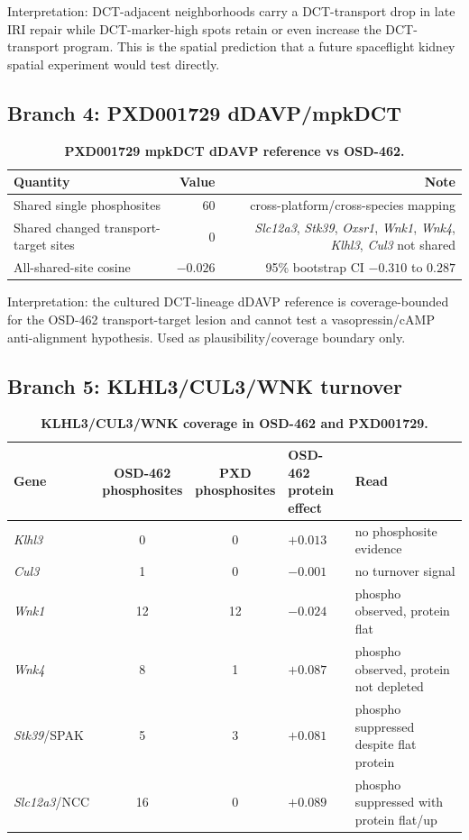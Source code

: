 \documentclass[10pt]{article}
\newcommand{\gene}[1]{\textit{#1}}
\begin{document}
\noindent
Interpretation: DCT-adjacent neighborhoods carry a DCT-transport drop in late IRI repair while DCT-marker-high spots retain or even increase the DCT-transport program. This is the spatial prediction that a future spaceflight kidney spatial experiment would test directly.

\subsection{Branch 4: PXD001729 dDAVP/mpkDCT}

\begin{table}[H]
\centering\small
\caption{\textbf{PXD001729 mpkDCT dDAVP reference vs OSD-462.}}
\label{tab:pxdshared}
\begin{tabular}{lrr}
\toprule
Quantity & Value & Note \\
\midrule
Shared single phosphosites & 60 & cross-platform/cross-species mapping \\
Shared changed transport-target sites & 0 & \gene{Slc12a3}, \gene{Stk39}, \gene{Oxsr1}, \gene{Wnk1}, \gene{Wnk4}, \gene{Klhl3}, \gene{Cul3} not shared \\
All-shared-site cosine & $-0.026$ & 95\% bootstrap CI $-0.310$ to $0.287$ \\
\bottomrule
\end{tabular}
\end{table}

\noindent
Interpretation: the cultured DCT-lineage dDAVP reference is coverage-bounded for the OSD-462 transport-target lesion and cannot test a vasopressin/cAMP anti-alignment hypothesis. Used as plausibility/coverage boundary only.

\subsection{Branch 5: KLHL3/CUL3/WNK turnover}

\begin{table}[H]
\centering\small
\caption{\textbf{KLHL3/CUL3/WNK coverage in OSD-462 and PXD001729.}}
\label{tab:klhlcoverage}
\begin{tabularx}{\textwidth}{lccp{}X}
\toprule
Gene & \shortstack{OSD-462\\phosphosites} & \shortstack{PXD\\phosphosites} & \shortstack{OSD-462\\protein effect} & Read \\
\midrule
\gene{Klhl3} & 0 & 0 & $+0.013$ & no phosphosite evidence \\
\gene{Cul3} & 1 & 0 & $-0.001$ & no turnover signal \\
\gene{Wnk1} & 12 & 12 & $-0.024$ & phospho observed, protein flat \\
\gene{Wnk4} & 8 & 1 & $+0.087$ & phospho observed, protein not depleted \\
\gene{Stk39}/SPAK & 5 & 3 & $+0.081$ & phospho suppressed despite flat protein \\
\gene{Slc12a3}/NCC & 16 & 0 & $+0.089$ & phospho suppressed with protein flat/up \\
\bottomrule
\end{tabularx}
\end{table}
\end{document}
